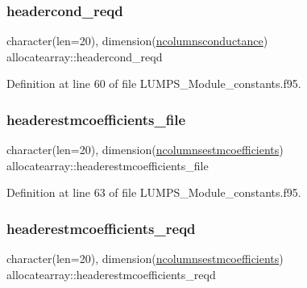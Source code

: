 \mbox{\label{namespaceallocatearray_ab87870fe28357b94254d1d6c35e06290}} 
\subsubsection{\texorpdfstring{headercond\+\_\+reqd}{headercond\_reqd}}
{\footnotesize\ttfamily character(len=20), dimension(\hyperlink{namespaceallocatearray_a2830c674e41c46900c1088c40baef680}{ncolumnsconductance}) allocatearray\+::headercond\+\_\+reqd}



Definition at line 60 of file L\+U\+M\+P\+S\+\_\+\+Module\+\_\+constants.\+f95.

\mbox{\label{namespaceallocatearray_ae482241585a630ce1c579f7016feaa72}} 
\subsubsection{\texorpdfstring{headerestmcoefficients\+\_\+file}{headerestmcoefficients\_file}}
{\footnotesize\ttfamily character(len=20), dimension(\hyperlink{namespaceallocatearray_ab6963e51ec24ecb58c1ee21fd8a70654}{ncolumnsestmcoefficients}) allocatearray\+::headerestmcoefficients\+\_\+file}



Definition at line 63 of file L\+U\+M\+P\+S\+\_\+\+Module\+\_\+constants.\+f95.

\mbox{\label{namespaceallocatearray_ae236b7dc5f2a5772c73b7f382f618cb5}} 
\subsubsection{\texorpdfstring{headerestmcoefficients\+\_\+reqd}{headerestmcoefficients\_reqd}}
{\footnotesize\ttfamily character(len=20), dimension(\hyperlink{namespaceallocatearray_ab6963e51ec24ecb58c1ee21fd8a70654}{ncolumnsestmcoefficients}) allocatearray\+::headerestmcoefficients\+\_\+reqd}



